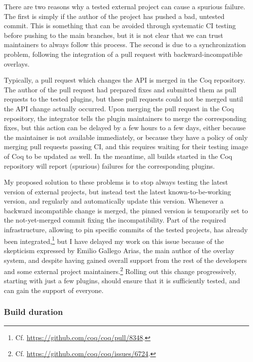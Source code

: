 There are two reasons why a tested external project can cause a spurious failure.
The first is simply if the author of the project has pushed a bad, untested commit.
This is something that can be avoided through systematic CI testing before pushing to the main branches, but it is not clear that we can trust maintainers to always follow this process.
The second is due to a synchronization problem, following the integration of a pull request with backward-incompatible overlays.

Typically, a pull request which changes the API is merged in the Coq repository.
The author of the pull request had prepared fixes and submitted them as pull requests to the tested plugins, but these pull requests could not be merged until the API change actually occurred.
Upon merging the pull request in the Coq repository, the integrator tells the plugin maintainers to merge the corresponding fixes, but this action can be delayed by a few hours to a few days, either because the maintainer is not available immediately, or because they have a policy of only merging pull requests passing CI, and this requires waiting for their testing image of Coq to be updated as well.
In the meantime, all builds started in the Coq repository will report (spurious) failures for the corresponding plugins.

My proposed solution to these problems is to stop always testing the latest version of external projects, but instead test the latest known-to-be-working version, and regularly and automatically update this version.
Whenever a backward incompatible change is merged, the pinned version is temporarily set to the not-yet-merged commit fixing the incompatibility.
Part of the required infrastructure, allowing to pin specific commits of the tested projects, has already been integrated,\footnote{
	Cf. \url{https://github.com/coq/coq/pull/8348}.
}
but I have delayed my work on this issue because of the skepticism expressed by Emilio Gallego Arias, the main author of the overlay system, and despite having gained overall support from the rest of the developers and some external project maintainers.\footnote{
	Cf. \url{https://github.com/coq/coq/issues/6724}.
}
Rolling out this change progressively, starting with just a few plugins, should ensure that it is sufficiently tested, and can gain the support of everyone.

\subsubsection{Build duration}

